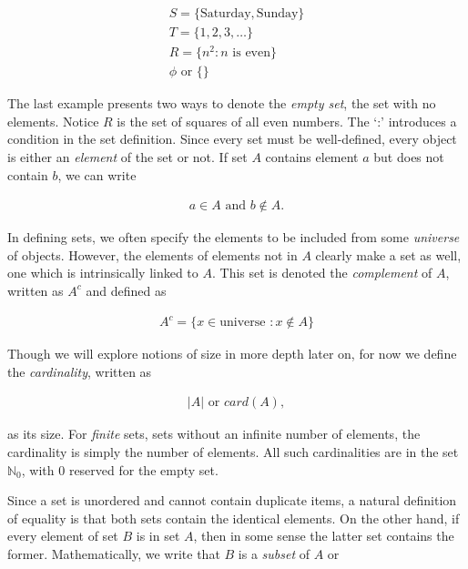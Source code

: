 \documentclass[twoside]{report}
\begin{document}
\begin{align*}
	S = \{\text{Saturday}, \text{Sunday}\} \\
	T = \{1, 2, 3, \dots \} \\
	R = \{n^2 : n \text{ is even} \} \\
	\phi \text{ or } \{ \}
\end{align*}

The last example presents two ways to denote the \emph{empty set},  the set with no elements. Notice $R$ is the set of squares of all even numbers. The `:' introduces a condition in the set definition. Since every set must be well-defined, every object is either an \emph{element}  of the set or not. If set $A$ contains element $a$ but does not contain $b$, we can write

\begin{align*}
	a \in A \text{ and } b \notin A.
\end{align*}

In defining sets, we often specify the elements to be included from some \emph{universe}  of objects. However, the elements of elements not in $A$ clearly make a set as well, one which is intrinsically linked to $A$. This set is denoted the \emph{complement}  of $A$, written as $A^c$ and defined as

\begin{align*}
	A^c = \{ x \in \text{universe } : x \notin A \}
\end{align*}

Though we will explore notions of size in more depth later on, for now we define the \emph{cardinality},  written as 

\begin{align*}
	|A| \text{ or } card(A),
\end{align*}

as its size. For \emph{finite}  sets, sets without an infinite number of elements, the cardinality is simply the number of elements. All such cardinalities are in the set $\mathbb{N}_0$, with 0 reserved for the empty set.

Since a set is unordered and cannot contain duplicate items, a natural definition of equality is that both sets contain the identical elements. On the other hand, if every element of set $B$ is in set $A$, then in some sense the latter set contains the former. Mathematically, we write that $B$ is a \emph{subset}  of $A$ or
\end{document}
